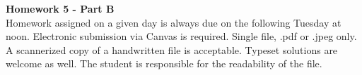 \documentclass{article}
\begin{document}


{\bf Homework 5 - Part B}\\

Homework assigned on a given day is always due on the following Tuesday at noon. Electronic submission via Canvas is required. Single file, .pdf or .jpeg only.  A scannerized copy of a handwritten file is acceptable. Typeset solutions are welcome as well. The student is responsible for the readability of the file. 
\end{document}
